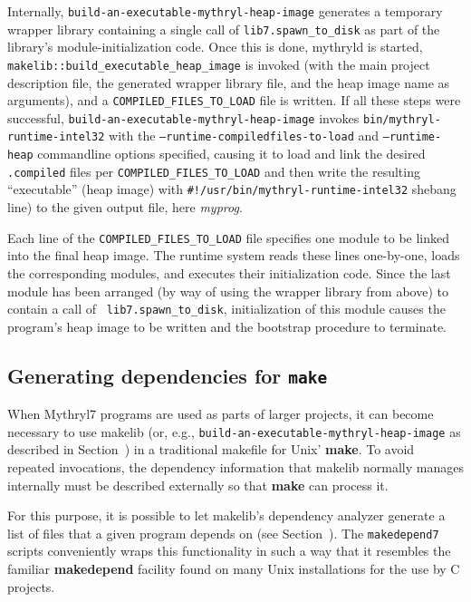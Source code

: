 Internally, {\tt build-an-executable-mythryl-heap-image} generates a temporary wrapper library
containing a single call of {\tt lib7.spawn_to_disk} as part of the
library's module-initialization code.  Once this is done, mythryld is
started, {\tt makelib::build_executable_heap_image} is invoked (with the main project
description file, the generated wrapper library file, and the heap
image name as arguments), and a {\tt COMPILED_FILES_TO_LOAD} file is written.
If all these steps were successful, {\tt build-an-executable-mythryl-heap-image}
invokes {\tt bin/mythryl-runtime-intel32} with the {\tt --runtime-compiledfiles-to-load} and
{\tt --runtime-heap} commandline options specified, causing it to load and link the
desired {\tt .compiled} files per {\tt COMPILED_FILES_TO_LOAD} and then
write the resulting ``executable'' (heap image) with {\tt #!/usr/bin/mythryl-runtime-intel32} shebang line)
to the given output file, here {\em myprog}.

Each line of the {\tt COMPILED_FILES_TO_LOAD} file specifies one module to be linked
into the final heap image.  The runtime system reads these
lines one-by-one, loads the corresponding modules, and executes their
initialization code.  Since the last module has been arranged (by way
of using the wrapper library from above) to contain a call of {\tt
lib7.spawn_to_disk}, initialization of this module causes the program's
heap image to be written and the bootstrap procedure to terminate.

\subsection{Generating dependencies for {\tt make}}
\label{sec:makedepend}

When Mythryl7 programs are used as parts of larger projects, it can become
necessary to use makelib (or, e.g., {\tt build-an-executable-mythryl-heap-image}
as described in Section~)
in a traditional makefile for Unix' {\bf make}.
To avoid repeated invocations, the dependency information that
makelib normally manages internally must be described externally so that
{\bf make} can process it.

For this purpose, it is possible to let makelib's dependency analyzer
generate a list of files that a given program depends on (see
Section~).  The {\tt makedepend7}
scripts conveniently wraps this functionality in such a way that it
resembles the familiar {\bf makedepend} facility found on many Unix
installations for the use by C projects.

